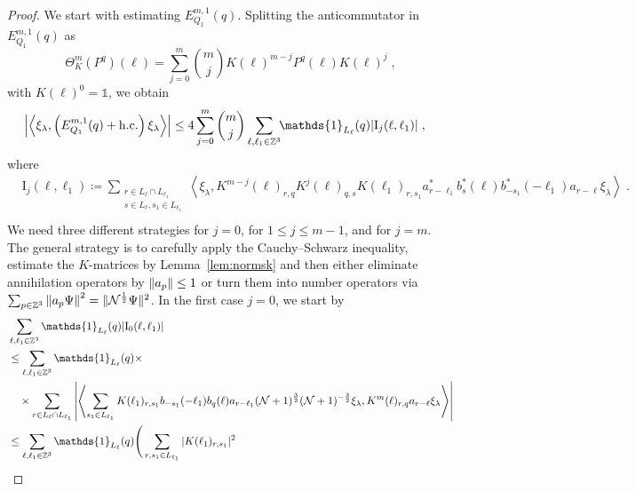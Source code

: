 \documentclass[12pt,a4paper]{article}
\numberwithin{equation}{section}
\newcommand{\cN}{\mathcal{N}}
\newcommand{\1}{\mathbb{I}}
\newcommand{\I}{\mathrm{I}}
\newcommand{\Zstar}{\mathbb{Z}^3} %
\newcommand{\Z}{\mathbb{Z}}
\newcommand{\NN}{\mathcal{N}}
\newcommand{\half}{\frac{1}{2}}
\newcommand{\eva}[1]{\left\langle #1 \right\rangle}
\theoremstyle{plain}
\theoremstyle{definition}
\theoremstyle{remark}
\theoremstyle{plain}
\theoremstyle{definition}
\theoremstyle{remark}
\begin{document}
\begin{proof}
We start with estimating $ E^{m,1}_{Q_1}(q) $. Splitting the anticommutator in $ E^{m,1}_{Q_1}(q) $ as
\begin{equation} \label{eq:q-q}
	\Theta^m_K(P^q)(\ell)
	= \sum_{j=0}^m {{m}\choose j} K(\ell)^{m-j} P^q(\ell) K(\ell)^{j} \;,
\end{equation}
with $ K(\ell)^0 = \mathds{1} $, we obtain
\begin{equation} \label{eq:EQ1111}
\begin{aligned}
	& \abs{\eva{\xi_\lambda,\left(E^{m,1}_{Q_1}(q) +  \mathrm{h.c.}\right) \xi_\lambda }}
	\le 4 \sum_{j=0}^m {{m}\choose j} \sum_{\ell,\ell_1  \in \Zstar}\!\! \mathds{1}_{L_\ell}(q) | \I_j(\ell, \ell_1)| \;,
	\end{aligned}
\end{equation}
where
\begin{equation}
\begin{aligned}
& 	\I_j(\ell, \ell_1)
	\coloneq \sum_{\substack{r\in L_{\ell} \cap L_{\ell_1}\\ s \in L_{\ell},s_1\in L_{\ell_1}}}
		\eva{\xi_\lambda, K^{m-j}(\ell)_{r,q} K^{j}(\ell)_{q,s} K(\ell_1)_{r,s_1} a^*_{r-\ell_1} b^*_{s}(\ell) b^*_{-s_1}(-\ell_1) a_{r-\ell} \xi_\lambda} \;. \\
\end{aligned}
\end{equation}
We need three different strategies for $ j = 0 $, for $ 1 \le j \le m-1 $, and for $ j = m $. The general strategy is to carefully apply the Cauchy--Schwarz inequality, estimate the $ K $-matrices by Lemma~\ref{lem:normsk} and then either eliminate annihilation operators by $ \norm{a_p} \le 1 $ or turn them into number operators via $ \sum_{p \in \Z^3} \norm{a_p \Psi}^2 = \Vert \cN^{\half} \Psi \Vert^2 $. In the first case $ j = 0 $, we start by
\begin{align}
	&\sum_{\ell,\ell_1 \in \Zstar} \mathds{1}_{L_\ell}(q) |\I_0(\ell, \ell_1)| \nonumber\\
	&\le \sum_{\ell,\ell_1 \in \Zstar} \mathds{1}_{L_\ell}(q) \times \nonumber\\
	&\quad \times \sum\limits_{r \in L_\ell \cap L_{\ell_1}} \abs{\eva{ \sum\limits_{s_1 \in L_{\ell_1}} K(\ell_1)_{r,s_1} b_{-s_1}(-\ell_1) b_{q}(\ell) a_{r-\ell_1} (\NN+1)^{\frac 32} (\NN+1)^{-\frac 32} \xi_\lambda, K^{m}(\ell)_{r,q} a_{r-\ell} \xi_\lambda }}\nonumber\\
	&\leq \sum_{\ell,\ell_1 \in \Zstar} \mathds{1}_{L_\ell}(q) \Bigg( \sum_{r,s_1 \in L_{\ell_1}} |K(\ell_1)_{r,s_1}|^2

\end{align}
\end{proof}
\end{document}
